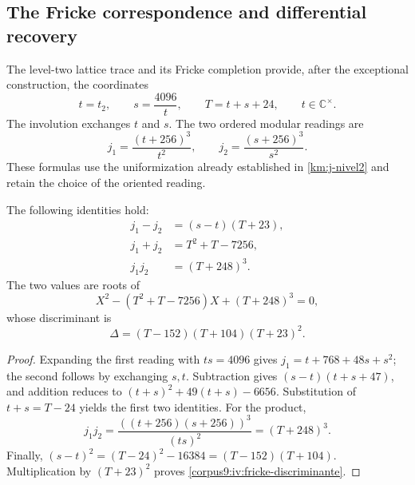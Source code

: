 \subsection{The Fricke correspondence and differential recovery}
\label{corpus9:iv:fricke}

The level-two lattice trace and its Fricke completion
provide, after the exceptional construction, the
coordinates
\[
 t=t_2,\qquad s=\frac{4096}{t},\qquad
 T=t+s+24,\qquad t\in\mathbb C^\times.
\]
The involution exchanges \(t\) and \(s\). The two ordered
modular readings are
\[
 j_1=\frac{(t+256)^3}{t^2},\qquad
 j_2=\frac{(s+256)^3}{s^2}.
\]
These formulas use the uniformization already established in
\eqref{km:j-nivel2} and retain the choice of the oriented reading.

\begin{proposition}
\label{corpus9:iv:fricke-correspondencia}
The following identities hold:
\begin{align}
 j_1-j_2&=(s-t)(T+23),\\
 j_1+j_2&=T^2+T-7256,\\
 j_1j_2&=(T+248)^3.
 \label{corpus9:iv:fricke-simetricos}
\end{align}
The two values are roots of
\[
 X^2-(T^2+T-7256)X+(T+248)^3=0,
\]
whose discriminant is
\begin{equation}
 \Delta=(T-152)(T+104)(T+23)^2.
 \label{corpus9:iv:fricke-discriminante}
\end{equation}
\end{proposition}
\begin{proof}
Expanding the first reading with \(ts=4096\) gives
\(j_1=t+768+48s+s^2\); the second follows by exchanging
\(s,t\). Subtraction gives \((s-t)(t+s+47)\), and addition
reduces to \((t+s)^2+49(t+s)-6656\). Substitution of
\(t+s=T-24\) yields the first two identities. For the product,
\[
 j_1j_2
 =\frac{((t+256)(s+256))^3}{(ts)^2}
 =(T+248)^3.
\]
Finally,
\((s-t)^2=(T-24)^2-16384=(T-152)(T+104)\).
Multiplication by \((T+23)^2\) proves
\eqref{corpus9:iv:fricke-discriminante}.
\end{proof}

